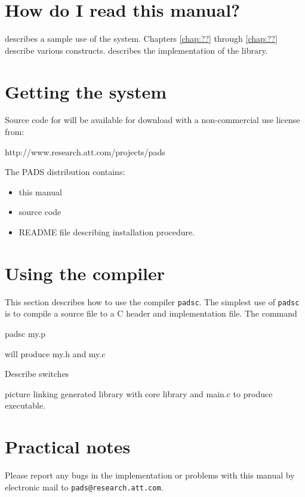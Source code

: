 \section{How do I read this manual?}
 describes a sample use of the \pads{} system.
Chapters \ref{chap:??} through \ref{chap:??} describe various
constructs. 
 describes the implementation of the
library. 


\section{Getting the \pads{} system}
Source code for \pads{} will be available for download with
a non-commercial use license from: 
\begin{centercode}
http://www.research.att.com/projects/pads
\end{centercode}

The PADS distribution contains:
\begin{itemize}
\item this manual
\item source code 
\item README file describing installation procedure.
\end{itemize}

\section{Using the \pads{} compiler}
This section describes how to use the \pads{} compiler \texttt{padsc}.
The simplest use of \texttt{padsc} is to compile a \padsl{} source file
to a C header and implementation file.  The command
\begin{centercode}
padsc my.p
\end{centercode} %
will produce my.h and my.c

Describe switches

picture linking generated library with core library and main.c to
produce executable.

\section{Practical notes}
Please report any bugs in the \pads{} implementation or problems with
this manual by electronic mail to \texttt{pads@research.att.com}.
